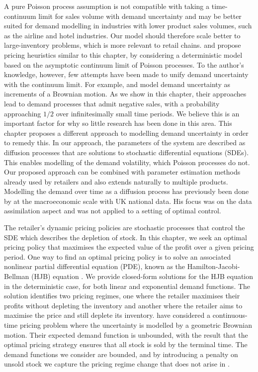 \documentclass[main.tex]{subfiles}
\begin{document}
A pure Poisson process assumption is not compatible with taking a
time-continuum limit for sales volume with demand uncertainty and may
be better suited for demand
modelling in industries with lower product sales volumes, such as
the airline and hotel industries. Our model should therefore scale
better to large-inventory problems, which is more relevant to retail chains.
\citet{maglaras2006dynamic} and \citet{schlosser2015dynamic1,schlosser2015dynamic2}
propose pricing heuristics similar to this
chapter, by considering a deterministic model based on the asymptotic continuum
limit of Poisson processes.
To the author's knowledge, however,
few attempts have been made to unify demand uncertainty with the continuum
limit. For example, \citet{raman1995optimal} and \citet{wu2016dynamic} model
demand uncertainty as increments of a Brownian motion. As we show
in this chapter, their approaches lead to demand processes that admit
negative sales, with a probability approaching $1/2$ over
infinitesimally small time periods. We believe this is an important
factor for why so little research has been done in this area.
This chapter proposes a different
approach to modelling demand uncertainty in order to remedy this.
In our approach, the parameters of the system are described
as diffusion processes that are solutions to
stochastic differential equations (SDEs).
This enables modelling of the demand volatility, which Poisson
processes do not.
Our proposed approach can be combined with parameter estimation
methods already used by retailers
and also extends naturally to multiple products.
Modelling the demand over time as a diffusion process has previously
been done by \citet{chambers1992estimation} at the macroeconomic scale
with UK national data. His focus was on the data assimilation aspect and was not
applied to a setting of optimal control.

The retailer's dynamic pricing policies are stochastic processes that
control the SDE which describes the depletion of stock. In this
chapter, we seek an optimal pricing policy that maximises the expected value of
the profit over a given pricing period.
One way to find an optimal pricing policy is to solve an associated nonlinear partial
differential equation (PDE), known as the Hamilton-Jacobi-Bellman (HJB) equation
\citep{pham2009continuous}.
We provide closed-form solutions for the HJB equation in the
deterministic case, for both linear
and exponential demand functions. The solution identifies two pricing
regimes, one where the retailer maximises their profits without
depleting the inventory and another
where the retailer aims to maximise the price and still deplete
its inventory.
\citet{xu2006monopolistic} have considered a continuous-time pricing
problem where the uncertainty is modelled by a geometric Brownian
motion. Their expected demand function is unbounded, with the result that the
optimal pricing strategy ensures that all stock is sold by the
terminal time. The demand functions we consider are bounded, and by
introducing a penalty on unsold stock we capture the pricing regime
change that does not arise in \citet{xu2006monopolistic}.
\end{document}
